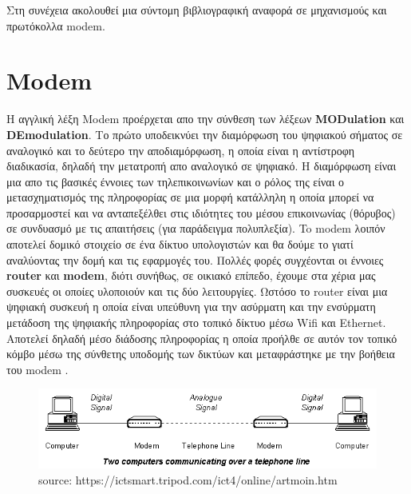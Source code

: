 \documentclass[hidelinks, 12pt, a4paper]{article}
\begin{document}
Στη συνέχεια ακολουθεί μια σύντομη βιβλιογραφική αναφορά σε μηχανισμούς και πρωτόκολλα modem.


\pagebreak
\section{Modem}

Η αγγλική λέξη Modem προέρχεται απο την σύνθεση των λέξεων \textbf{MODulation} και \textbf{DEmodulation}. Το πρώτο υποδεικνύει την διαμόρφωση του ψηφιακού σήματος σε αναλογικό και το δεύτερο την αποδιαμόρφωση, η οποία είναι η αντίστροφη διαδικασία, δηλαδή την μετατροπή απο αναλογικό σε ψηφιακό. Η διαμόρφωση είναι μια απο τις βασικές έννοιες των τηλεπικοινωνίων και ο ρόλος της είναι ο μετασχηματισμός της πληροφορίας σε μια μορφή κατάλληλη η οποία μπορεί να προσαρμοστεί και να ανταπεξέλθει στις ιδιότητες του μέσου επικοινωνίας (θόρυβος) σε συνδυασμό με τις απαιτήσεις (για παράδειγμα πολυπλεξία). To modem λοιπόν αποτελεί δομικό στοιχείο σε ένα δίκτυο υπολογιστών και θα δούμε το γιατί αναλύοντας την δομή και τις εφαρμογές του. Πολλές φορές συγχέονται οι έννοιες \textbf{router} και \textbf{modem}, διότι συνήθως, σε οικιακό επίπεδο, έχουμε στα χέρια μας συσκευές οι οποίες υλοποιούν και τις δύο λειτουργίες. Ωστόσο το router είναι μια ψηφιακή συσκευή η οποία είναι υπεύθυνη για την ασύρματη και την ενσύρματη μετάδοση της ψηφιακής πληροφορίας στο τοπικό δίκτυο μέσω Wifi και Ethernet. Αποτελεί δηλαδή μέσο διάδοσης πληροφορίας η οποία προήλθε σε αυτόν τον τοπικό κόμβο μέσω της σύνθετης υποδομής των δικτύων και μεταφράστηκε με την βοήθεια του modem \cite{modem}.

\begin{figure}[h!]
\centering
	\includegraphics[keepaspectratio, width=.8\textwidth]{assets/modem2.png}
    \caption{source: https://ictsmart.tripod.com/ict4/online/artmoin.htm}
\end{figure}
\end{document}
